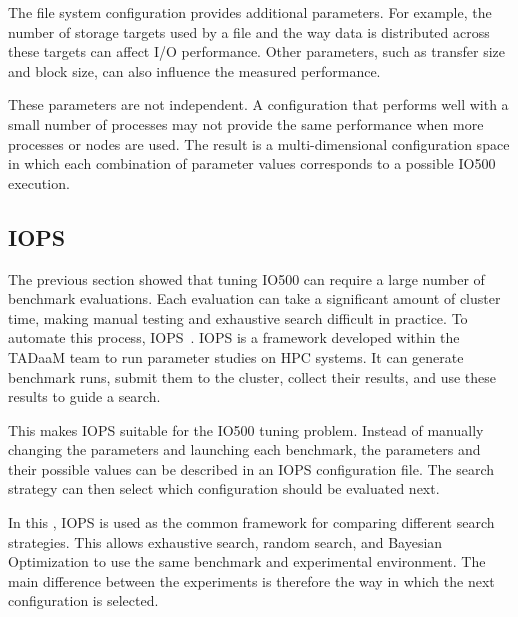 The file system configuration provides additional parameters. For
example, the number of storage targets used by a file and the way data
is distributed across these targets can affect I/O performance. Other
parameters, such as transfer size and block size, can also influence
the measured performance.

These parameters are not independent. A configuration that performs
well with a small number of processes may not provide the same
performance when more processes or nodes are used.  The result is a multi-dimensional configuration space in which each
combination of parameter values corresponds to a possible IO500
execution. 




\subsection{IOPS}

The previous section showed that tuning IO500 can require a large number of
benchmark evaluations. Each evaluation can take a significant amount of
cluster time, making manual testing and exhaustive search difficult in
practice. To automate this process,  IOPS~\cite{iops}. IOPS is a
framework developed within the TADaaM team to run parameter studies on
HPC systems. It can generate benchmark runs, submit them to the cluster,
collect their results, and use these results to guide a search.

This makes IOPS suitable for the IO500 tuning problem. Instead of manually
changing the parameters and launching each benchmark, the parameters and
their possible values can be described in an IOPS configuration file. The
search strategy can then select which configuration should be evaluated
next.

In this , IOPS is used as the common framework for comparing
different search strategies. This allows exhaustive search, random search,
and Bayesian Optimization to use the same benchmark and experimental
environment. The main difference between the experiments is therefore the
way in which the next configuration is selected.


